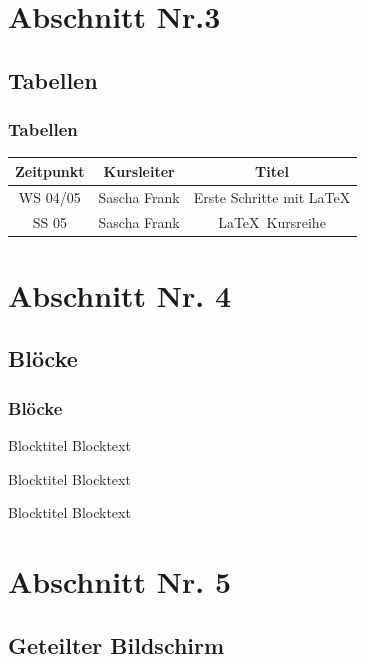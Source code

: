 \documentclass[compress,aspectratio=169]{beamer} %
\begin{document}
	\section{Abschnitt Nr.3} 
	\subsection{Tabellen}
	\begin{frame}
		\frametitle{Tabellen}
		\begin{tabular}{|c|c|c|}
			\hline
			\textbf{Zeitpunkt} & \textbf{Kursleiter} & \textbf{Titel} \\
			\hline
			WS 04/05 & Sascha Frank &  Erste Schritte mit \LaTeX  \\
			\hline
			SS 05 & Sascha Frank & \LaTeX \ Kursreihe \\
			\hline
		\end{tabular}
	\end{frame}
	
	
\section{Abschnitt Nr. 4}
	\subsection{Bl\"ocke}
	\begin{frame}
		\frametitle{Bl\"ocke}
		
		\begin{block}{Blocktitel}
			Blocktext 
		\end{block}
		
		\begin{exampleblock}{Blocktitel}
			Blocktext 
		\end{exampleblock}
		
		
		\begin{alertblock}{Blocktitel}
			Blocktext 
		\end{alertblock}
	\end{frame}
	
\section{Abschnitt Nr. 5}
	\subsection{Geteilter Bildschirm}
	
\end{document}
